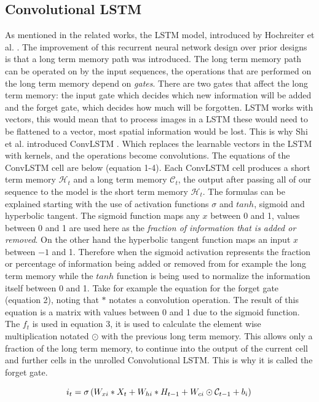 \subsection{Convolutional LSTM}
As mentioned in the related works, the LSTM model, introduced by Hochreiter et al. \cite{lstm}.
The improvement of this recurrent neural network design over prior designs is that a long term memory path was introduced.
The long term memory path can be operated on by the input sequences, the operations that are performed on the long term memory
depend on \textit{gates}. There are two gates that affect the long term memory: the input gate which decides which new information will be added and the forget gate, which decides how much will be forgotten.
LSTM works with vectors, this would mean that to process images in a LSTM these would need to be flattened to a vector, most spatial information would be lost. This is why Shi et al. introduced ConvLSTM \cite{convlstm}.
Which replaces the learnable vectors in the LSTM with kernels, and the operations become convolutions.
The equations of the ConvLSTM cell are below (equation 1-4). Each ConvLSTM cell produces a short term memory $ \mathcal{H}_{t}$ and a long term memory $\mathcal{C}_{t}$,
the output after passing all of our sequence to the model is the short term memory $\mathcal{H}_{t}$. 
The formulas can be explained starting with the use of activation functions $\sigma$ and $tanh$, sigmoid and hyperbolic tangent.
The sigmoid function maps any $x$ between 0 and 1, values between 0 and 1 are used here as the \textit{fraction of information that is added or removed}.
On the other hand the hyperbolic tangent function maps an input $x$ between $-1$ and 1. Therefore when the sigmoid activation represents the fraction or percentage of information being added or removed from for example the
long term memory while the $tanh$ function is being used to normalize the information itself between 0 and 1.
Take for example the equation for the forget gate (equation 2), noting that $*$ notates a convolution operation.
The result of this equation is a matrix with values between 0 and 1 due to the sigmoid function.
The $f_t$ is used in equation 3, it is used to calculate the element wise multiplication notated $\odot$
with the previous long term memory. This allows only a fraction of the long term memory, to continue into the output of the
current cell and further cells in the unrolled Convolutional LSTM. This is why it is called the forget gate. 

\begin{equation}
  i_{t} = \sigma\left(W_{xi} * X_{t} + W_{hi} * H_{t-1} + W_{ci} \odot \mathcal{C}_{t-1} + b_{i}\right)\\
\end{equation}

